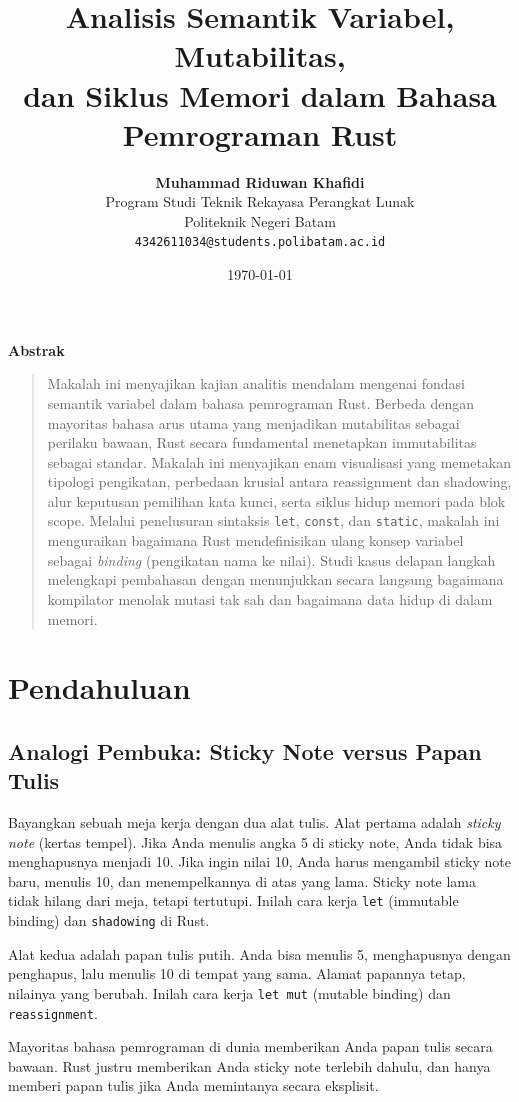 \documentclass[11pt,a4paper]{article}
\title{\vspace{-1.5cm}\textbf{\sffamily\LARGE Analisis Semantik Variabel, Mutabilitas,\\ dan Siklus Memori dalam Bahasa Pemrograman Rust}}
\author{
	\textbf{Muhammad Riduwan Khafidi} \\
	\small Program Studi Teknik Rekayasa Perangkat Lunak \\
	\small Politeknik Negeri Batam \\
	\small \texttt{4342611034@students.polibatam.ac.id}
}
\date{\small\today}
\renewenvironment{abstract}
{\small
	\begin{center}\textbf{\sffamily Abstrak}\end{center}
	\begin{quote}}
	{\end{quote}}
\begin{document}
\maketitle
\thispagestyle{empty}

\begin{abstract}
	Makalah ini menyajikan kajian analitis mendalam mengenai fondasi semantik variabel dalam bahasa pemrograman Rust. Berbeda dengan mayoritas bahasa arus utama yang menjadikan mutabilitas sebagai perilaku bawaan, Rust secara fundamental menetapkan immutabilitas sebagai standar. Makalah ini menyajikan enam visualisasi yang memetakan tipologi pengikatan, perbedaan krusial antara reassignment dan shadowing, alur keputusan pemilihan kata kunci, serta siklus hidup memori pada blok scope. Melalui penelusuran sintaksis \texttt{let}, \texttt{const}, dan \texttt{static}, makalah ini menguraikan bagaimana Rust mendefinisikan ulang konsep variabel sebagai \textit{binding} (pengikatan nama ke nilai). Studi kasus delapan langkah melengkapi pembahasan dengan menunjukkan secara langsung bagaimana kompilator menolak mutasi tak sah dan bagaimana data hidup di dalam memori.
\end{abstract}

\section{Pendahuluan}

\subsection{Analogi Pembuka: Sticky Note versus Papan Tulis}

Bayangkan sebuah meja kerja dengan dua alat tulis. Alat pertama adalah \textit{sticky note} (kertas tempel). Jika Anda menulis angka 5 di sticky note, Anda tidak bisa menghapusnya menjadi 10. Jika ingin nilai 10, Anda harus mengambil sticky note baru, menulis 10, dan menempelkannya di atas yang lama. Sticky note lama tidak hilang dari meja, tetapi tertutupi. Inilah cara kerja \texttt{let} (immutable binding) dan \texttt{shadowing} di Rust.

Alat kedua adalah papan tulis putih. Anda bisa menulis 5, menghapusnya dengan penghapus, lalu menulis 10 di tempat yang sama. Alamat papannya tetap, nilainya yang berubah. Inilah cara kerja \texttt{let mut} (mutable binding) dan \texttt{reassignment}.

Mayoritas bahasa pemrograman di dunia memberikan Anda papan tulis secara bawaan. Rust justru memberikan Anda sticky note terlebih dahulu, dan hanya memberi papan tulis jika Anda memintanya secara eksplisit.
\end{document}
